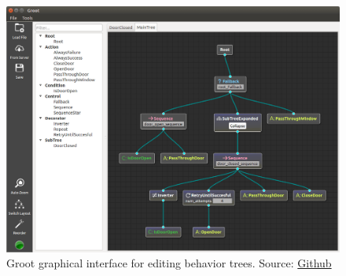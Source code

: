 \begin{figure}[htbp]
    \centering
    \includegraphics[width=1\linewidth]
    {Preliminaries/figures/groot.png}
    \caption{Groot graphical interface for editing behavior trees. Source: \href{https://github.com/BehaviorTree/Groot}{Github}}
    \label{fig:predator}
\end{figure}

\endinput